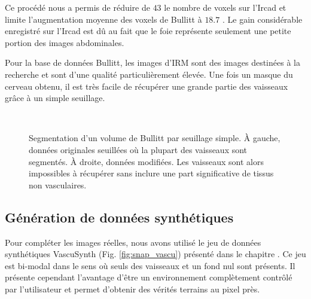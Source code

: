 Ce procédé nous a permis de réduire de $43$ \percent{}le nombre de voxels sur l'Ircad et limite l'augmentation moyenne des voxels de Bullitt à $18.7$ \percent. Le gain considérable enregistré sur l'Ircad est dû au fait que le foie représente seulement une petite portion des images abdominales.

Pour la base de données Bullitt, les images d'IRM sont des images destinées à la recherche et sont d'une qualité particulièrement élevée. Une fois un masque du cerveau obtenu, il est très facile de récupérer une grande partie des vaisseaux grâce à un simple seuillage. 
\begin{figure}[!ht]
  \centering
   \\
  \caption{Segmentation d'un volume de Bullitt par seuillage simple. À gauche, données originales seuillées où la plupart des vaisseaux sont segmentés. À droite, données modifiées. Les vaisseaux sont alors impossibles à récupérer sans inclure une part significative de tissus non vasculaires.}
  \label{fig:modifications_bullitt}
\end{figure}
\subsection{Génération de données synthétiques}
Pour compléter les images réelles, nous avons utilisé le jeu de données synthétiques VascuSynth (Fig. \ref{fig:snap_vascu}) présenté dans le chapitre \chapContext{}. Ce jeu est bi-modal dans le sens où seuls des vaisseaux et un fond nul sont présents. Il présente cependant l'avantage d'être un environnement complètement contrôlé par l'utilisateur et permet d'obtenir des vérités terrains au pixel près. 

